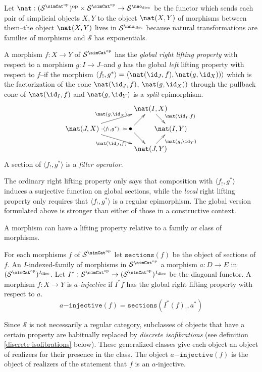 \documentclass{tac}
\newcommand\cat\mathcal
\newcommand\ri{^*}
\newcommand\dual{^{\mathrm{op}}}
\newcommand\disc{_{\mathrm{disc}}}
\newcommand\s{^{\simCat\dual}}
\newcommand\bang{!}
\newcommand\of{:}
\newcommand\code\mathtt
\newcommand\pair[2]{\langle #1,#2\rangle}
\begin{document}
\begin{definition} Let $\nat\of(\cat S\s)\dual\times \cat S\s \to \cat S^{\nno\disc}$ be the functor which sends each pair of simplicial objects $X,Y$ to the object $\nat(X,Y)$ of morphisms between them--the object $\nat(X,Y)$ lives in $\cat S^{\nno\disc}$ because natural transformations are families of morphisms and $\cat S$ has exponentials.

A morphism $f\of X\to Y$ of $\cat S\s$ has the \emph{global right lifting property} with respect to a morphism $g\of I\to J$--and $g$ has the global \emph{left} lifting property with respect to $f$--if the morphism $\pair{f_!}{g\ri} = \pair{\nat(\id_J,f)}{\nat(g,\id_X))}$ 
which is the factorization of the cone $\nat(\id_J,f)$, $\nat(g,\id_X))$ through the pullback cone of $\nat(\id_I,f)$ and $\nat(g,\id_Y)$
is a \emph{split} epimorphism.
\[\xy
(34,20)*+{\nat(I,X)}="top",(0,10)*+{\nat(J,X)}="left",(24,10)*+{\bullet}="middle",(44,10)*+{\nat(I,Y)}="right",(34,0)*+{\nat(J,Y)}="bottom"
\ar^{\nat(g,\id_X)} "left";"top" \ar@{.>}|(.6){\pair{f_!}{g\ri}} "left";"middle" \ar_{\nat(\id_J,f)} "left";"bottom" \ar "middle";"bottom"
\ar "middle";"top" \ar^(.6){\nat(\id_I,f)} "top";"right" \ar_(.6){\nat(g,\id_Y)} "bottom";"right"
\endxy\]
A section of $\pair{f_\bang}{g\ri}$ is a \emph{filler operator}.\label{lifting}
\end{definition}

The ordinary right lifting property only says that composition with $\pair{f_\bang}{g\ri}$ induces a surjective function on global sections, while the \emph{local} right lifting property only requires that $\pair{f_\bang}{g\ri}$ is a regular epimorphism. The global version formulated above is stronger than either of those in a constructive context.

A morphism can have a lifting property relative to a family or class of morphisms.

\begin{definition}[Injective] For each morphisms $f$ of $\cat S\s$ let $\code{sections}(f)$ be the object of sections of $f$. An $I$-indexed-family of morphisms in $\cat S\s$ a morphism $a\of D\to E$ in $(\cat S\s)^{I\disc}$. Let $I\ri\of\cat S\s\to (\cat S\s)^{I\disc}$ be the diagonal functor. A morphism $f\of X\to Y$ is \emph{$a$-injective} if $I\ri f$ has the global right lifting property with respect to $a$.
\[ a\code{-injective}(f)=\code{sections}(I\ri(f)_\bang,a\ri) \]
\end{definition}

\begin{remark}
Since $\cat S$ is not necessarily a regular category, subclasses of objects that have a certain property are habitually replaced by \emph{discrete isofibrations} (see definition \ref{discrete isofibrations} below). These generalized classes give each object an object of realizers for their presence in the class. The object $a\code{-injective}(f)$ is the object of realizers of the statement that $f$ is an $a$-injective.
\end{remark}
\end{document}

